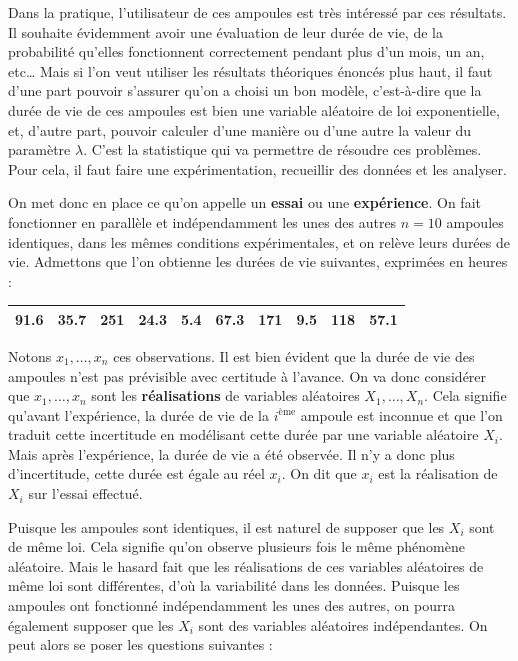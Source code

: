 \documentclass[]{book}
\theoremstyle{magentacolor}
\theoremstyle{proprie}
\theoremstyle{exstyle}
\theoremstyle{exostyle}
\theoremstyle{definition}
\theoremstyle{definition}
\theoremstyle{definition}
\theoremstyle{remark}
\begin{document}
Dans la pratique, l'utilisateur de ces ampoules est très intéressé par ces résultats. Il
souhaite évidemment avoir une évaluation de leur durée de vie, de la probabilité qu'elles
fonctionnent correctement pendant plus d'un mois, un an, etc\ldots{} Mais si l'on veut utiliser les résultats théoriques énoncés plus haut, il faut d'une part pouvoir s'assurer qu'on a choisi un bon modèle, c'est-à-dire que la durée de vie de ces ampoules est bien une variable aléatoire de loi exponentielle, et, d'autre part, pouvoir calculer d'une manière ou d'une autre la valeur du paramètre \(\lambda\). C'est la statistique qui va permettre de résoudre ces problèmes. Pour cela, il faut faire une expérimentation, recueillir des données et les analyser.

On met donc en place ce qu'on appelle un \textbf{essai} ou une \textbf{expérience}. On fait fonctionner en parallèle et indépendamment les unes des autres \(n = 10\) ampoules identiques, dans les mêmes conditions expérimentales, et on relève leurs durées de vie. Admettons que l'on obtienne les durées de vie suivantes, exprimées en heures :

\begin{tabular}{r|r|r|r|r|r|r|r|r|r}
\hline
91.6 & 35.7 & 251 & 24.3 & 5.4 & 67.3 & 171 & 9.5 & 118 & 57.1\\
\hline
\end{tabular}

Notons \(x_1 ,\ldots,x_n\) ces observations. Il est bien évident que la durée de vie des ampoules n'est pas prévisible avec certitude à l'avance. On va donc considérer que \(x_1 ,\ldots,x_n\) sont les \textbf{réalisations} de variables aléatoires \(X_1 ,\ldots,X_n\). Cela signifie qu'avant l'expérience, la durée de vie de la \(i^{\text{ème}}\) ampoule est inconnue et que l'on traduit cette incertitude en modélisant cette durée par une variable aléatoire \(X_i\). Mais après l'expérience, la durée de vie a été observée. Il n'y a donc plus d'incertitude, cette durée est égale au réel \(x_i\). On dit que \(x_i\) est la réalisation de \(X_i\) sur l'essai effectué.

Puisque les ampoules sont identiques, il est naturel de supposer que les \(X_i\) sont de
même loi. Cela signifie qu'on observe plusieurs fois le même phénomène aléatoire. Mais le
hasard fait que les réalisations de ces variables aléatoires de même loi sont différentes, d'où la variabilité dans les données. Puisque les ampoules ont fonctionné indépendamment les unes des autres, on pourra également supposer que les \(X_i\) sont des variables aléatoires indépendantes. On peut alors se poser les questions suivantes :
\end{document}
